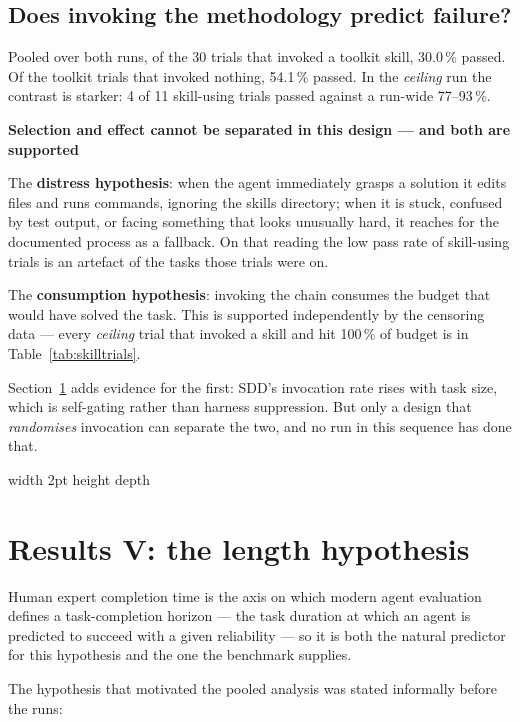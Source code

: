 \documentclass[11pt,a4paper]{article}
\newenvironment{finding}[1]
  {\par\medskip\noindent\begin{lrbox}{\findingbox}%
   \begin{minipage}{\dimexpr\linewidth-2\fboxsep-4pt}%
   \vspace{3pt}\textbf{\color{accent}#1}\par\smallskip\small}
  {\vspace{4pt}\end{minipage}\end{lrbox}%
   \noindent\textcolor{accent}{\vrule width 2pt height \dimexpr\ht\findingbox\relax depth \dimexpr\dp\findingbox\relax}%
   \colorbox{shade}{\usebox{\findingbox}}\par\medskip}
\begin{document}
\subsection{Does invoking the methodology predict failure?}
\label{sec:selection}

Pooled over both runs, of the 30 trials that invoked a toolkit skill, 30.0\,\% passed. Of the
toolkit trials that invoked nothing, 54.1\,\% passed. In the \emph{ceiling} run the contrast
is starker: 4 of 11 skill-using trials passed against a run-wide 77--93\,\%.

\begin{finding}{Selection and effect cannot be separated in this design --- and both are supported}
The \textbf{distress hypothesis}: when the agent immediately grasps a solution it edits files
and runs commands, ignoring the skills directory; when it is stuck, confused by test output,
or facing something that looks unusually hard, it reaches for the documented process as a
fallback. On that reading the low pass rate of skill-using trials is an artefact of the tasks
those trials were on.

The \textbf{consumption hypothesis}: invoking the chain consumes the budget that would have
solved the task. This is supported independently by the censoring data --- every
\emph{ceiling} trial that invoked a skill and hit 100\,\% of budget is in
Table~\ref{tab:skilltrials}.

Section~\ref{sec:length} adds evidence for the first: SDD's invocation rate rises with task
size, which is self-gating rather than harness suppression. But only a design that
\emph{randomises} invocation can separate the two, and no run in this sequence has done that.
\end{finding}

\clearpage
\section{Results V: the length hypothesis}
\label{sec:length}

Human expert completion time is the axis on which modern agent evaluation defines a
task-completion horizon --- the task duration at which an agent is predicted to succeed with a
given reliability \citep{kwa2025horizons} --- so it is both the natural predictor for this
hypothesis and the one the benchmark supplies.

The hypothesis that motivated the pooled analysis was stated informally before the runs:
\end{document}
